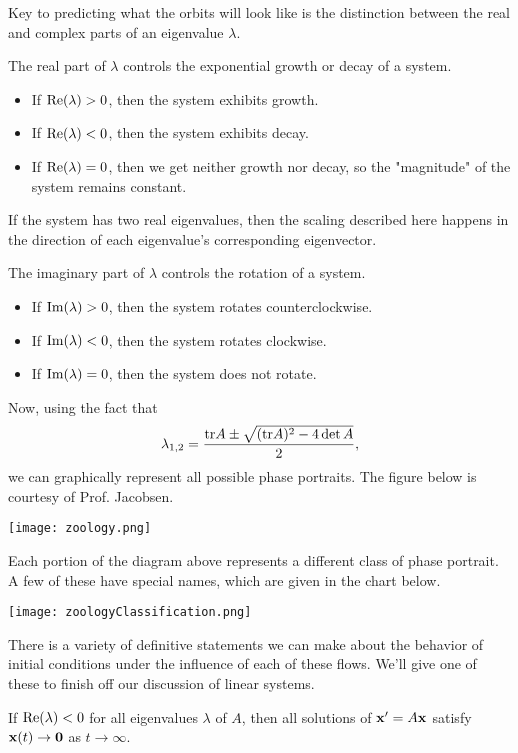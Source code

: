 \documentclass[../m082main.tex]{subfiles}
\begin{document}
Key to predicting what the orbits will look like is the distinction between the real and complex parts of an eigenvalue $\lambda$.

The real part of $\lambda$ controls the exponential growth or decay of a system.
\begin{itemize}
    \item If $\textrm{Re} (\lambda) > 0$, then the system exhibits growth.
    \item If $\textrm{Re} (\lambda) < 0$, then the system exhibits decay.
    \item If $\textrm{Re} (\lambda) = 0$, then we get neither growth nor decay, so the "magnitude" of the system remains constant.
\end{itemize}
If the system has two real eigenvalues, then the scaling described here happens in the direction of each eigenvalue's corresponding eigenvector.

The imaginary part of $\lambda$ controls the rotation of a system.
\begin{itemize}
    \item If $\textrm{Im} (\lambda) > 0$, then the system rotates counterclockwise.
    \item If $\textrm{Im} (\lambda) < 0$, then the system rotates clockwise.
    \item If $\textrm{Im} (\lambda) = 0$, then the system does not rotate.
\end{itemize}

Now, using the fact that
\[ \lambda_{1,2} = \frac{\textrm{tr} A \pm \sqrt{(\textrm{tr} A)^2 - 4 \det A}}{2}, \]
we can graphically represent all possible phase portraits.
The figure below is courtesy of Prof. Jacobsen.
\begin{center}
    \texttt{[image: zoology.png]}
\end{center}
Each portion of the diagram above represents a different class of phase portrait.
A few of these have special names, which are given in the chart below.
\begin{center}
    \texttt{[image: zoologyClassification.png]}
\end{center}

There is a variety of definitive statements we can make about the behavior of initial conditions under the influence of each of these flows.
We'll give one of these to finish off our discussion of linear systems.

\begin{theorem}
    If $\textrm{Re} (\lambda) < 0$ for all eigenvalues $\lambda$ of $A$, then all solutions of $\mathbf{x}' = A \mathbf{x}$ satisfy $\mathbf{x}(t) \to \mathbf{0}$ as $t \to \infty$.
\end{theorem}
\end{document}
